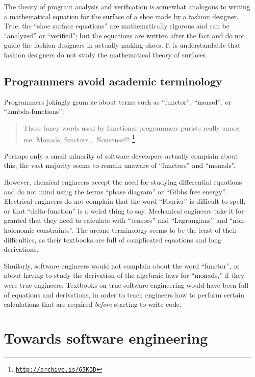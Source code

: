 The theory of program analysis and verification is somewhat analogous
to writing a mathematical equation for the surface of a shoe made
by a fashion designer. True, the ``shoe surface equations'' are
mathematically rigorous and can be ``analyzed'' or ``verified'';
but the equations are written after the fact and do not guide the
fashion designers in actually making shoes. It is understandable that
fashion designers do not study the mathematical theory of surfaces.

\subsection{Programmers avoid academic terminology }

Programmers jokingly grumble about terms such as ``functor'', ``monad'',
or ``lambda-functions'':
\begin{quote}
{\small{}Those fancy words used by functional programmers purists
really annoy me. Monads, functors... Nonsense!!! }\footnote{\texttt{\href{http://archive.is/65K3D}{http://archive.is/65K3D}}}
\end{quote}
Perhaps only a small minority of software developers actually complain
about this; the vast majority seems to remain unaware of ``functors''
and ``monads''.

However, chemical engineers accept the need for studying differential
equations and do not mind using the terms ``phase diagram'' or ``Gibbs
free energy''. Electrical engineers do not complain that the word
``Fourier'' is difficult to spell, or that ``delta-function''
is a weird thing to say. Mechanical engineers take it for granted
that they need to calculate with ``tensors'' and ``Lagrangians''
and ``non-holonomic constraints''. The arcane terminology seems
to be the least of their difficulties, as their textbooks are full
of complicated equations and long derivations.

Similarly, software engineers would not complain about the word ``functor'',
or about having to study the derivation of the algebraic laws for
``monads,'' \textemdash{} if they were true engineers. Textbooks
on true software engineering would have been full of equations and
derivations, in order to teach engineers how to perform certain calculations
that are required \emph{before} starting to write code.

\section{Towards software engineering }

